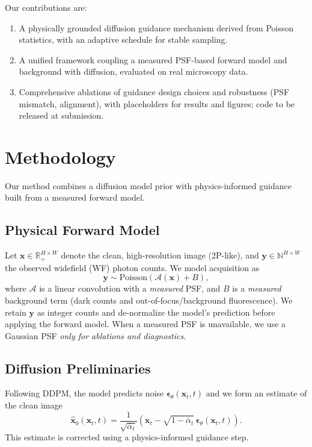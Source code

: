 \documentclass{article}
\newcommand{\wf}{WF\xspace}
\newcommand{\twop}{2P\xspace}
\begin{document}
Our contributions are:
\begin{enumerate}
    \item A physically grounded diffusion guidance mechanism derived from Poisson statistics, with an adaptive schedule for stable sampling.
    \item A unified framework coupling a measured PSF-based forward model and background with diffusion, evaluated on real microscopy data.
    \item Comprehensive ablations of guidance design choices and robustness (PSF mismatch, alignment), with placeholders for results and figures; code to be released at submission.
\end{enumerate}

\section{Methodology}
\label{sec:methodology}
Our method combines a diffusion model prior with physics-informed guidance built from a measured forward model.

\subsection{Physical Forward Model}
Let $\mathbf{x} \in \mathbb{R}_+^{H\times W}$ denote the clean, high-resolution image (\twop-like), and $\mathbf{y} \in \mathbb{N}^{H\times W}$ the observed widefield (\wf) photon counts. We model acquisition as
\begin{equation}
\mathbf{y} \sim \mathrm{Poisson}(\mathcal{A}(\mathbf{x}) + B),
\end{equation}
where $\mathcal{A}$ is a linear convolution with a \emph{measured} PSF, and $B$ is a \emph{measured} background term (dark counts and out-of-focus/background fluorescence). We retain $\mathbf{y}$ as integer counts and de-normalize the model's prediction before applying the forward model. When a measured PSF is unavailable, we use a Gaussian PSF \emph{only for ablations and diagnostics}.

\subsection{Diffusion Preliminaries}
Following DDPM, the model predicts noise $\boldsymbol{\epsilon}_\theta(\mathbf{x}_t, t)$ and we form an estimate of the clean image
\begin{equation}
\hat{\mathbf{x}}_0(\mathbf{x}_t,t) = \frac{1}{\sqrt{\bar{\alpha}_t}}\left(\mathbf{x}_t - \sqrt{1-\bar{\alpha}_t}\,\boldsymbol{\epsilon}_\theta(\mathbf{x}_t, t)\right).
\end{equation}
This estimate is corrected using a physics-informed guidance step.
\end{document}
